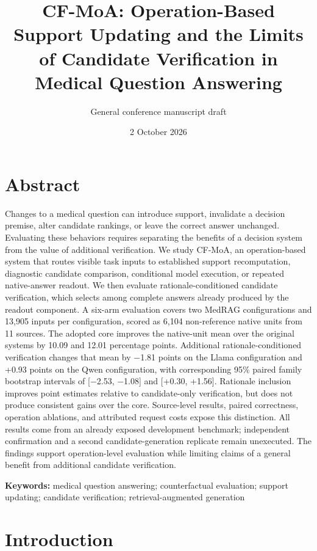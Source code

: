 \documentclass[
  english,
  11pt,
]{article}
\title{CF-MoA: Operation-Based Support Updating and the Limits of
Candidate Verification in Medical Question Answering}
\subtitle{General conference manuscript draft}
\author{}
\date{2 October 2026}
\begin{document}
\maketitle

\section*{Abstract}\label{abstract}

Changes to a medical question can introduce support, invalidate a
decision premise, alter candidate rankings, or leave the correct answer
unchanged. Evaluating these behaviors requires separating the benefits
of a decision system from the value of additional verification. We study
CF-MoA, an operation-based system that routes visible task inputs to
established support recomputation, diagnostic candidate comparison,
conditional model execution, or repeated native-answer readout. We then
evaluate rationale-conditioned candidate verification, which selects
among complete answers already produced by the readout component. A
six-arm evaluation covers two MedRAG configurations and 13,905 inputs
per configuration, scored as 6,104 non-reference native units from 11
sources. The adopted core improves the native-unit mean over the
original systems by 10.09 and 12.01 percentage points. Additional
rationale-conditioned verification changes that mean by −1.81 points on
the Llama configuration and +0.93 points on the Qwen configuration, with
corresponding 95\% paired family bootstrap intervals of {[}−2.53,
−1.08{]} and {[}+0.30, +1.56{]}. Rationale inclusion improves point
estimates relative to candidate-only verification, but does not produce
consistent gains over the core. Source-level results, paired
correctness, operation ablations, and attributed request costs expose
this distinction. All results come from an already exposed development
benchmark; independent confirmation and a second candidate-generation
replicate remain unexecuted. The findings support operation-level
evaluation while limiting claims of a general benefit from additional
candidate verification.

\textbf{Keywords:} medical question answering; counterfactual
evaluation; support updating; candidate verification;
retrieval-augmented generation

\section{Introduction}\label{introduction}
\end{document}
